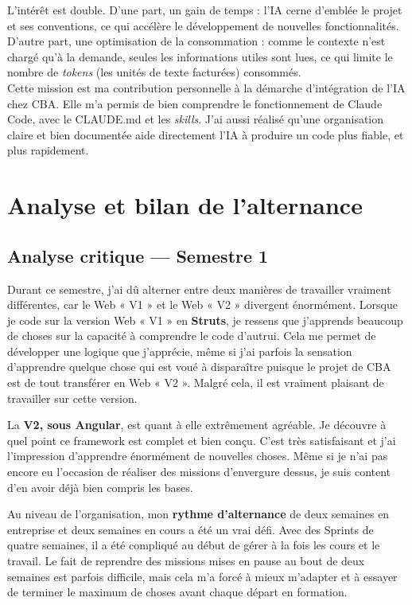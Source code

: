 \documentclass{article}
\begin{document}
L'intérêt est double. D'une part, un gain de temps : l'IA cerne d'emblée le projet et ses conventions, ce qui accélère le développement de nouvelles fonctionnalités. D'autre part, une optimisation de la consommation : comme le contexte n'est chargé qu'à la demande, seules les informations utiles sont lues, ce qui limite le nombre de \textit{tokens} (les unités de texte facturées) consommés.\\

Cette mission est ma contribution personnelle à la démarche d'intégration de l'IA chez CBA. Elle m'a permis de bien comprendre le fonctionnement de Claude Code, avec le CLAUDE.md et les \textit{skills}. J'ai aussi réalisé qu'une organisation claire et bien documentée aide directement l'IA à produire un code plus fiable, et plus rapidement.

\section{Analyse et bilan de l'alternance}

\subsection{Analyse critique --- Semestre 1}

Durant ce semestre, j'ai dû alterner entre deux manières de travailler vraiment différentes, car le Web « V1 » et le Web « V2 » divergent énormément. Lorsque je code sur la version Web « V1 » en \textbf{Struts}, je ressens que j'apprends beaucoup de choses sur la capacité à comprendre le code d'autrui. Cela me permet de développer une logique que j'apprécie, même si j'ai parfois la sensation d'apprendre quelque chose qui est voué à disparaître puisque le projet de CBA est de tout transférer en Web « V2 ». Malgré cela, il est vraiment plaisant de travailler sur cette version.

La \textbf{V2, sous Angular}, est quant à elle extrêmement agréable. Je découvre à quel point ce framework est complet et bien conçu. C'est très satisfaisant et j'ai l'impression d'apprendre énormément de nouvelles choses. Même si je n'ai pas encore eu l'occasion de réaliser des missions d'envergure dessus, je suis content d'en avoir déjà bien compris les bases.

Au niveau de l'organisation, mon \textbf{rythme d'alternance} de deux semaines en entreprise et deux semaines en cours a été un vrai défi. Avec des Sprints de quatre semaines, il a été compliqué au début de gérer à la fois les cours et le travail. Le fait de reprendre des missions mises en pause au bout de deux semaines est parfois difficile, mais cela m'a forcé à mieux m'adapter et à essayer de terminer le maximum de choses avant chaque départ en formation.
\end{document}
